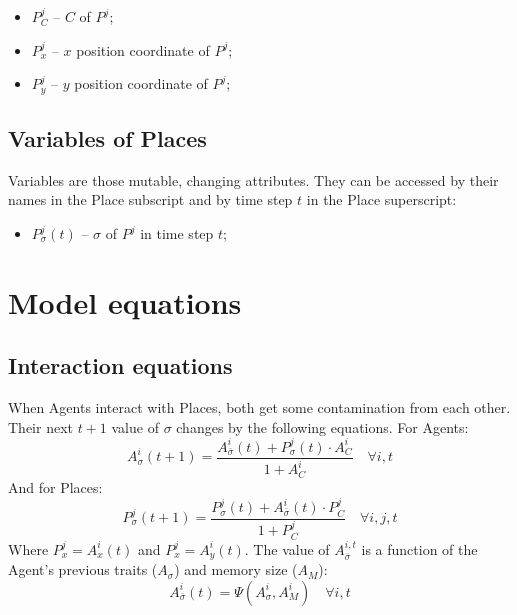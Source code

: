 \documentclass{article}
\begin{document}
\begin{itemize}
    \item $P^{j}_{C}$ -- $C$ of $P^{j}$;
    \item $P^{j}_{x}$ -- $x$ position coordinate of $P^{j}$;
    \item $P^{j}_{y}$ -- $y$ position coordinate of $P^{j}$;
\end{itemize}

\subsection{Variables of Places}

\par Variables are those mutable, changing attributes. They can be accessed by their names in the Place subscript and by time step $t$ in the Place superscript:

\begin{itemize}
    \item $P^{j}_{\sigma}(t)$ -- $\sigma$ of $P^{j}$ in time step $t$;
\end{itemize}

\section{Model equations}

\subsection{Interaction equations}

\par When Agents interact with Places, both get some contamination from each other. Their next $t+1$ value of $\sigma$ changes by the following equations. For Agents:
\begin{equation}
    A^{i}_{\sigma}(t + 1) = \frac{A^{i}_{\bar{\sigma}}(t) + P^{j}_{\sigma}(t) \cdot A^{i}_{C}}{1 + A^{i}_{C}} \quad \forall i, t
\end{equation}
And for Places:
\begin{equation}
    P^{j}_{\sigma}(t + 1) = \frac{P^{j}_{\sigma}(t) + A^{i}_{\bar{\sigma}}(t)\cdot P^{j}_{C}}{1 + P^{j}_{C}} \quad \forall i, j, t
\end{equation}
Where $P^{j}_{x} = A^{i}_{x}(t)$ and $P^{j}_{x} = A^{i}_{y}(t)$. The value of $A^{i, t}_{\bar{\sigma}}$ is a function of the Agent's previous traits ($A_{\sigma}$) and memory size ($A_M$):
\begin{equation}
    A^{i}_{\bar{\sigma}}(t) = \Psi(A^{i}_{\sigma}, A^{i}_{M}) \quad \forall i, t
\end{equation}
\end{document}
